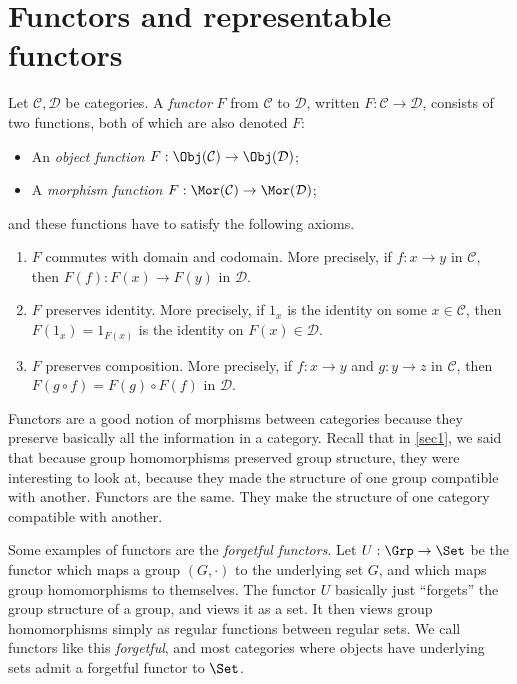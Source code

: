 \documentclass[11pt, A4]{article}
\begin{document}
\section{Functors and representable functors}

\begin{definition}\label{3.1}
	Let $\mathcal{C} ,\mathcal{D} $ be categories. A \emph{functor} $F$ from $\mathcal{C} $ to $\mathcal{D} $, written $F : \mathcal{C}  \to \mathcal{D} $, consists of two functions, both of which are also denoted $F$:
	\begin{itemize}
		\item An \emph{object function} $F : \Obj(\mathcal{C} )  \to \Obj(\mathcal{D} ) $;
		\item A \emph{morphism function} $F : \Mor(\mathcal{C} ) \to \Mor(\mathcal{D} )$;
	\end{itemize}
	and these functions have to satisfy the following axioms.
	\begin{enumerate}
		\item $F$ commutes with domain and codomain. More precisely, if $f : x \to y$ in $\mathcal{C} $, then $F(f):F(x) \to F(y)$ in $\mathcal{D} $.
		\item $F$ preserves identity. More precisely, if $1_x$ is the identity on some $x\in \mathcal{C} $, then $F(1_x)=1_{F(x)} $ is the identity on $F(x)\in \mathcal{D} $.
		\item $F$ preserves composition. More precisely, if $f : x \to y$ and $g : y \to z$ in $\mathcal{C} $, then $F(g\circ f)=F(g)\circ F(f)$ in $\mathcal{D} $.
	\end{enumerate}
\end{definition}

Functors are a good notion of morphisms between categories because they preserve basically all the information in a category. Recall that in \cref{sec1}, we said that because group homomorphisms preserved group structure, they were interesting to look at, because they made the structure of one group compatible with another. Functors are the same. They make the structure of one category compatible with another.

Some examples of functors are the \emph{forgetful functors}. Let $U : \Grp  \to \Set $ be the functor which maps a group $(G,\cdot )$ to the underlying set $G$, and which maps group homomorphisms to themselves. The functor $U$ basically just ``forgets'' the group structure of a group, and views it as a set. It then views group homomorphisms simply as regular functions between regular sets. We call functors like this \emph{forgetful}, and most categories where objects have underlying sets admit a forgetful functor to $\Set $.
\end{document}
